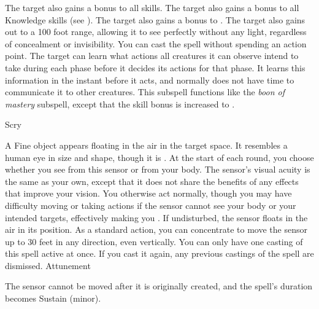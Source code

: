 The target also gains a  bonus to all skills.
The target also gains a  bonus to all Knowledge skills (see ).
The target also gains a  bonus to .
The target also gains  out to a 100 foot range, allowing it to see perfectly without any light, regardless of concealment or invisibility.
You can cast the spell without spending an action point.
The target can learn what actions all creatures it can observe intend to take during each phase before it decides its actions for that phase.
It learns this information in the instant before it acts, and normally does not have time to communicate it to other creatures.
This subspell functions like the \textit{boon of mastery} subspell, except that the skill bonus is increased to .
\begin{spellsection}{Scry}
\begin{spellheader}
\end{spellheader}
\begin{spellcontent}
\begin{spelltargetinginfo}
\end{spelltargetinginfo}
\begin{spelleffects}
\spelleffect
A Fine object appears floating in the air in the target space.
It resembles a human eye in size and shape, though it is .
At the start of each round, you choose whether you see from this sensor or from your body.
The sensor's visual acuity is the same as your own, except that it does not share the benefits of any  effects that improve your vision.
You otherwise act normally, though you may have difficulty moving or taking actions if the sensor cannot see your body or your intended targets, effectively making you \blinded.
If undisturbed, the sensor floats in the air in its position.
As a standard action, you can concentrate to move the sensor up to 30 feet in any direction, even vertically.
You can only have one casting of this spell active at once.
If you cast it again, any previous castings of the spell are dismissed.
\spelldur Attunement
\end{spelleffects}
\end{spellcontent}
\begin{spellfooter}
\end{spellfooter}
\begin{spellsubcontent}
\begin{spellcantrip}
The sensor cannot be moved after it is originally created, and the spell's duration becomes Sustain (minor).
\end{spellcantrip}
\end{spellsubcontent}
\end{spellsection}
